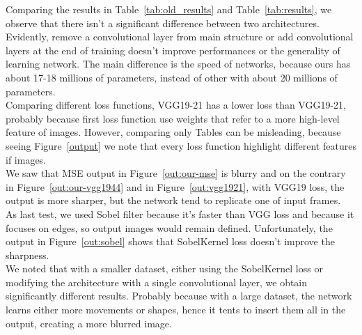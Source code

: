 \documentclass[11pt, a4paper]{article}
\begin{document}
	\vspace{0.5cm}
	Comparing the results in Table~\ref{tab:old_results} and Table~\ref{tab:results}, we observe that there isn't a significant difference between two architectures. Evidently, remove a convolutional layer from main structure or add convolutional layers at the end of training doesn't improve performances or the generality of learning network. The main difference is the speed of networks, because ours has about 17-18 millions of parameters, instead of other with about 20 millions of parameters.\\
	Comparing different loss functions, VGG19-21 has a lower loss than VGG19-21, probably because first loss function use weights that refer to a more high-level feature of images. However, comparing only Tables can be misleading, because seeing Figure~\ref{output} we note that every loss function highlight different features if images.\\ We saw that MSE output in Figure~\ref{out:our-mse} is blurry and on the contrary in Figure~\ref{out:our-vgg1944} and in Figure~\ref{out:vgg1921}, with VGG19 loss, the output is more sharper, but the network tend to replicate one of input frames.\\
	As last test, we used Sobel filter because it's faster than VGG loss and because it focuses on edges, so output images would remain defined. Unfortunately, the output in Figure~\ref{out:sobel} shows that SobelKernel loss doesn't improve the sharpness.\\
	We noted that with a smaller dataset, either using the SobelKernel loss or modifying the architecture with a single convolutional layer, we obtain significantly different results. Probably because with a large dataset, the network learns either more movements or shapes, hence it tents to insert them all in the output, creating a more blurred image.
	
\end{document}
